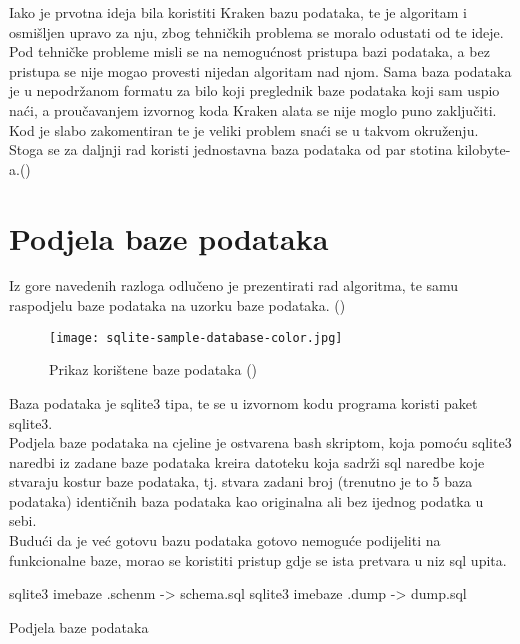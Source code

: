 \documentclass[times, utf8, zavrsni]{fer}
\begin{document}
Iako je prvotna ideja bila koristiti Kraken bazu podataka, te je algoritam i osmišljen upravo za nju, zbog tehničkih problema se moralo odustati od te ideje. Pod tehničke probleme misli se na nemogućnost pristupa bazi podataka, a bez pristupa se nije mogao provesti nijedan algoritam nad njom. Sama baza podataka je u nepodržanom formatu za bilo koji preglednik baze podataka koji sam uspio naći, a proučavanjem izvornog koda Kraken alata se nije moglo puno zaključiti. Kod je slabo zakomentiran te je veliki problem snaći se u takvom okruženju. Stoga se za daljnji rad koristi jednostavna baza podataka od par stotina kilobyte-a.(\cite{Database})

\section{Podjela baze podataka}
Iz gore navedenih razloga odlučeno je prezentirati rad algoritma, te samu raspodjelu baze podataka na uzorku baze podataka. (\cite{Database})
\begin{figure}[!htbp]
	\centering
	\texttt{[image: sqlite-sample-database-color.jpg]}
	\caption{Prikaz korištene baze podataka (\cite{Database})}
	\label{Db}
\end{figure}
Baza podataka je sqlite3 tipa, te se u izvornom kodu programa koristi paket sqlite3.\\
Podjela baze podataka na cjeline je ostvarena bash skriptom, koja  pomoću sqlite3 naredbi iz zadane baze podataka kreira datoteku koja sadrži sql naredbe koje stvaraju kostur baze podataka, tj. stvara zadani broj (trenutno je to 5 baza podataka) identičnih baza podataka kao originalna ali bez ijednog podatka u sebi.\\ Budući da je već gotovu bazu podataka gotovo nemoguće podijeliti na funkcionalne baze, morao se koristiti pristup gdje se ista pretvara u niz sql upita.

\begin{algorithm}[H]
		sqlite3 imebaze .schenm -> schema.sql\;
		sqlite3 imebaze .dump -> dump.sql\;
	\caption{Podjela baze podataka}
	\label{PodjelaBp}
\end{algorithm}
\end{document}
